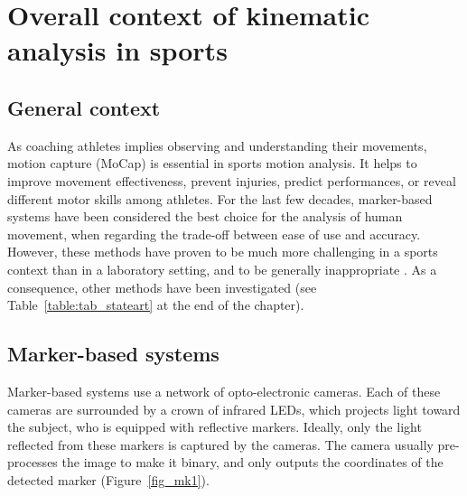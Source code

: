\minitoc
\newpage



\FloatBarrier
\section{Overall context of kinematic analysis in sports}
\subsection{General context}

As coaching athletes implies observing and understanding their movements, motion capture (MoCap) is essential in sports motion analysis. It helps to improve movement effectiveness, prevent injuries, predict performances, or reveal different motor skills among athletes. For the last few decades, marker-based systems have been considered the best choice for the analysis of human movement, when regarding the trade-off between ease of use and accuracy. However, these methods have proven to be much more challenging in a sports context than in a laboratory setting, and to be generally inappropriate \cite{Mündermann2006, Colyer2018}. As a consequence, other methods have been investigated (see Table~\ref{table:tab_stateart} at the end of the chapter).

\subsection{Marker-based systems}

Marker-based systems use a network of opto-electronic cameras. Each of these cameras are surrounded by a crown of infrared LEDs, which projects light toward the subject, who is equipped with reflective markers. Ideally, only the light reflected from these markers is captured by the cameras. The camera usually pre-processes the image to make it binary, and only outputs the coordinates of the detected marker (Figure~\ref{fig_mk1}). 

